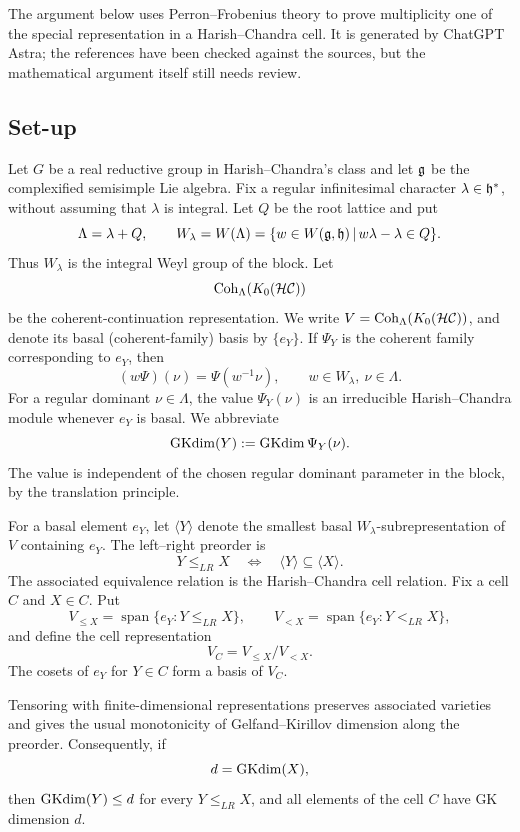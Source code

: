 \label{sec:structure-cell-representations}

The argument below uses Perron--Frobenius theory to prove multiplicity one of
the special representation in a Harish--Chandra cell. It is generated by
ChatGPT Astra; the references have been checked against the sources, but the
mathematical argument itself still needs review.

\subsection{Set-up}

Let $G$ be a real reductive group in Harish--Chandra's class and let $\mathfrak{g}$ be
the complexified semisimple Lie algebra. Fix a regular infinitesimal character
$\lambda \in \mathfrak{h}^*$, without assuming that $\lambda$ is integral. Let $Q$ be
the root lattice and put
\[
  \Lambda = \lambda + Q,
  \qquad
  W_\lambda = W(\Lambda)
   = \{w \in W(\mathfrak{g},\mathfrak{h})\,|\,w\lambda - \lambda \in Q\}.
\]
Thus $W_\lambda$ is the integral Weyl group of the block. Let
\[
  \operatorname{Coh}_{\Lambda}(K_0(\mathcal{HC}))
\]
be the coherent-continuation representation. We write
$V = \operatorname{Coh}_{\Lambda}(K_0(\mathcal{HC}))$, and denote its basal
(coherent-family) basis by $\{e_Y\}$. If $\Psi_Y$ is the coherent family
corresponding to $e_Y$, then
\[
  (w\Psi)(\nu) = \Psi(w^{-1}\nu),
  \qquad w \in W_\lambda,\ \nu \in \Lambda.
\]
For a regular dominant $\nu \in \Lambda$, the value $\Psi_Y(\nu)$ is an
irreducible Harish--Chandra module whenever $e_Y$ is basal. We abbreviate
\[
  \operatorname{GKdim}(Y) := \operatorname{GKdim} \Psi_Y(\nu).
\]
The value is independent of the chosen regular dominant parameter in the
block, by the translation principle.

For a basal element $e_Y$, let $\langle Y \rangle$ denote the smallest basal
$W_\lambda$-subrepresentation of $V$ containing $e_Y$. The left--right
preorder is
\[
  Y \leq_{LR} X
  \quad \Longleftrightarrow \quad
  \langle Y \rangle \subseteq \langle X \rangle.
\]
The associated equivalence relation is the Harish--Chandra cell relation.
Fix a cell $C$ and $X \in C$. Put
\[
  V_{\leq X} = \operatorname{span}\{e_Y : Y \leq_{LR} X\},
  \qquad
  V_{<X} = \operatorname{span}\{e_Y : Y <_{LR} X\},
\]
and define the cell representation
\[
  V_C = V_{\leq X} / V_{<X}.
\]
The cosets of $e_Y$ for $Y \in C$ form a basis of $V_C$.

Tensoring with finite-dimensional representations preserves associated
varieties and gives the usual monotonicity of Gelfand--Kirillov dimension
along the preorder. Consequently, if
\[
  d = \operatorname{GKdim}(X),
\]
then $\operatorname{GKdim}(Y) \leq d$ for every $Y \leq_{LR} X$, and all elements of the
cell $C$ have GK dimension $d$.

